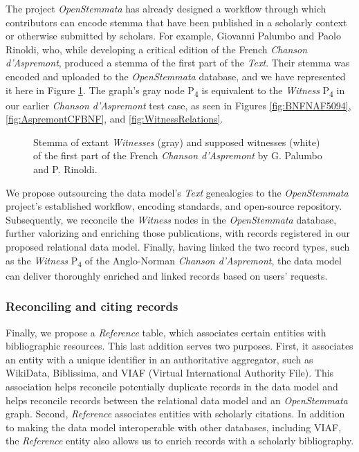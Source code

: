 The project \textit{OpenStemmata} has already designed a workflow through which contributors can encode stemma that have been published in a scholarly context or otherwise submitted by scholars. For example, Giovanni Palumbo and Paolo Rinoldi, who, while developing a critical edition of the French \textit{Chanson d'Aspremont}, produced a stemma of the first part of the \textit{Text}. Their stemma was encoded and uploaded to the \textit{OpenStemmata} database, and we have represented it here in Figure \ref{fig:GraphFramework}. The graph's gray node P\textsubscript{4} is equivalent to the \textit{Witness} P\textsubscript{4} in our earlier \textit{Chanson d'Aspremont} test case, as seen in Figures \ref{fig:BNFNAF5094}, \ref{fig:AspremontCFBNF}, and \ref{fig:WitnessRelations}.

\begin{figure}[ht]
    \begin{center}
        
    \end{center}
\caption{Stemma of extant \textit{Witnesses} (gray) and supposed witnesses (white) of the first part of the French \textit{Chanson d'Aspremont} by G. Palumbo and P. Rinoldi.}
\label{fig:GraphFramework}
\end{figure}

We propose outsourcing the data model's \textit{Text} genealogies to the \textit{OpenStemmata} project's established workflow, encoding standards, and open-source repository. Subsequently, we reconcile the \textit{Witness} nodes in the \textit{OpenStemmata} database, further valorizing and enriching those publications, with records registered in our proposed relational data model. Finally, having linked the two record types, such as the \textit{Witness} P\textsubscript{4} of the Anglo-Norman \textit{Chanson d'Aspremont}, the data model can deliver thoroughly enriched and linked records based on users' requests.

\subsubsection{Reconciling and citing records}

Finally, we propose a \textit{Reference} table, which associates certain entities with bibliographic resources. This last addition serves two purposes. First, it associates an entity with a unique identifier in an authoritative aggregator, such as WikiData, Biblissima, and VIAF (Virtual International Authority File). This association helps reconcile potentially duplicate records in the data model and helps reconcile records between the relational data model and an \textit{OpenStemmata} graph. Second, \textit{Reference} associates entities with scholarly citations. In addition to making the data model interoperable with other databases, including VIAF, the \textit{Reference} entity also allows us to enrich records with a scholarly bibliography.

